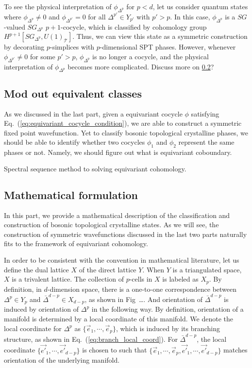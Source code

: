 \documentclass[%
 reprint,
 amsmath,amssymb,
 aps,pra,
]{revtex4-1}
\newcommand{\TT}{\mathcal{T}} %
\begin{document}
To see the physical interpretation of $\phi_{\Delta^p}$ for $p<d$, let us consider quantum states where $\phi_{\Delta^p}\neq 0$ and $\phi_{\Delta^{p'}}=0$ for all $\Delta^{p'}\in Y_{p'}$ with $p'>p$. 
In this case, $\phi_{\Delta^p}$ is a $SG$-valued $SG_{\Delta^p}$ $p+1$-cocycle, which is classified by cohomology group $H^{p+1}[SG_{\Delta^p},U(1)_{\TT}]$.
Thus, we can view this state as a symmetric construction by decorating $p$-simplices with $p$-dimensional SPT phases.
However, whenever $\phi_{\Delta^{p'}}\neq 0$ for some $p'>p$, $\phi_{\Delta^p}$ is no longer a cocycle, and the physical interpretation of $\phi_{\Delta^p}$ becomes more complicated.
{\color{red} Discuss more on \ref{subapp:equivariant_cohomology_math_formulation}?}

\subsection{Mod out equivalent classes}
As we discussed in the last part, given a equivariant cocycle $\phi$ satisfying Eq.~(\ref{eq:equivariant_cocycle_condition}), we are able to construct a symmetric fixed point wavefunction.
Yet to classify bosonic topological crystalline phases, we should be able to identify whether two cocycles $\phi_1$ and $\phi_2$ represent the same phases or not.
Namely, we should figure out what is equivariant coboundary.

{\color{red} Spectral sequence method to solving equivariant cohomology.}

\subsection{Mathematical formulation}\label{subapp:equivariant_cohomology_math_formulation}
In this part, we provide a mathematical description of the classification and construction of bosonic topological crystalline states.
As we will see, the construction of symmetric wavefunctions discussed in the last two parts naturally fits to the framework of equivariant cohomology\cite{Brown2012cohomology,ThorngrenElse2018gauging}. 

In order to be consistent with the convention in mathematical literature, let us define the dual lattice $X$ of the direct lattice $Y$.
When $Y$ is a triangulated space, $X$ is a trivalent lattice.
The collection of $p$-cells in $X$ is labeled as $X_p$.
By definition, in $d$-dimension space, there is a one-to-one correspondence between ${\Delta^p}\in Y_p$ and $\bar{\Delta}^{d-p}\in X_{d-p}$, as shown in Fig~\ldots.
And orientation of $\bar{\Delta}^{d-p}$ is induced by orientation of $\Delta^p$ in the following way.
By definition, orientation of a manifold is determined by a local coordinate of this manifold.
We denote the local coordinate for $\Delta^p$ as $\{\vec{e}_1,\cdots,\vec{e}_p\}$, which is induced by its branching structure, as shown in Eq.~(\ref{eq:branch_local_coord}).
For $\bar{\Delta}^{d-p}$, the local coordinate $\{\vec{e'}_1,\cdots,\vec{e'}_{d-p}\}$ is chosen to such that $\{\vec{e}_1,\cdots,\vec{e}_p,\vec{e'}_1,\cdots,\vec{e'}_{d-p}\}$ matches orientation of the underlying manifold.
\end{document}
